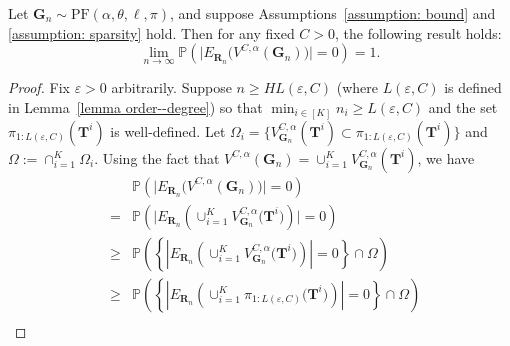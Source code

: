 \documentclass[twoside,11pt]{article}
\theoremstyle{remark}
\begin{document}
\begin{lemma}
\label{lemma: noise}
Let $\boldsymbol{G}_n \sim \mathrm{PF}(\alpha, \theta, \ell, \pi)$, and suppose Assumptions~\ref{assumption: bound} and \ref{assumption: sparsity} hold. Then for any fixed $C > 0$, the following result holds:
%
\begin{equation*}
     \lim_{n \rightarrow \infty} \mathbb{P}\left(\bigl|E_{\boldsymbol{R}_n}\bigl(V^{C,\alpha}\left(\boldsymbol{G}_n\right)\bigr)\bigr|=0\right)=1.
\end{equation*}
%
\end{lemma}
\begin{proof}


Fix $\varepsilon > 0$ arbitrarily. Suppose $n \geq H L(\varepsilon, C)$ (where $L(\varepsilon, C)$ is defined in Lemma~\ref{lemma order--degree}) so that $\min_{i \in [K]} n_i \geq L(\varepsilon, C)$ and the set $\pi_{1:L(\varepsilon, C)}(\boldsymbol{T}^i)$ is well-defined. Let $\Omega_i=\bigl\{ V^{C,\alpha}_{\boldsymbol{G}_n}\left(\boldsymbol{T}^i\right)\subset\pi_{1:{L\left(\varepsilon, C\right)}}\left(\boldsymbol{T}^i\right)\bigr\}$ and $ \Omega:=\cap_{i=1}^K \Omega_i$. Using the fact that $V^{C,\alpha}\left(\boldsymbol{G}_{n}\right)=\cup_{i=1}^K V^{C,\alpha}_{\boldsymbol{G}_n}\left(\boldsymbol{T}^i\right)$, we have
\begin{eqnarray} 
\label{lemma 2 eqn 2}
&&\mathbb{P}\left(\bigl|E_{\boldsymbol{R}_n}\bigl(V^{C,\alpha}\left(\boldsymbol{G}_n\right)\bigr)\bigr|=0\right) \nonumber \\
%
&=&\mathbb{P}\left(\biggl|E_{\boldsymbol{R}_n}\left(\cup_{i=1}^K V^{C,\alpha}_{\boldsymbol{G}_n}\bigl(\boldsymbol{T}^i\bigr)\right)\biggr|=0\right) \nonumber \\
\nonumber
&\geq & \mathbb{P}\left(\left\{\left|E_{\boldsymbol{R}_n}\left(\cup_{i=1}^K V^{C,\alpha}_{\boldsymbol{G}_n}\bigl(\boldsymbol{T}^i\bigr)\right)\right|=0 \right\}\cap \Omega\right)\\
\nonumber
%
&\geq& \mathbb{P}\left(\left\{\left|E_{\boldsymbol{R}_n}\left(\cup_{i=1}^K \pi_{1:L\left(\varepsilon,C\right)}\bigl(\boldsymbol{T}^i\bigr)\right)\right|=0\right\}\cap \Omega\right)\\

\end{eqnarray}
\end{proof}
\end{document}

